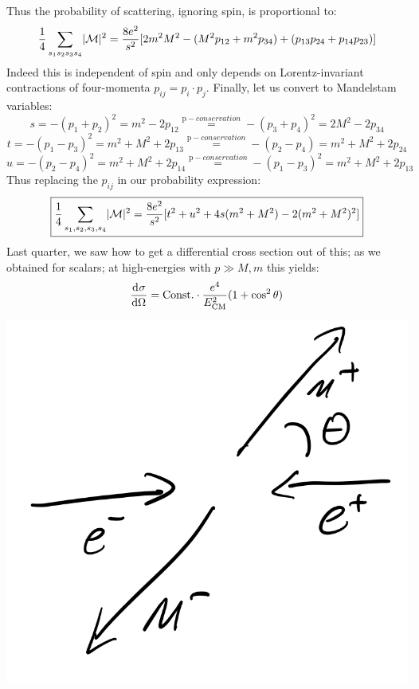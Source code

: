 Thus the probability of scattering, ignoring spin, is proportional to:
\begin{equation}
    \frac{1}{4}\sum_{s_1s_2s_3s_4}\lvert \mathcal{M} \rvert^2 = \frac{8e^2}{s^2}[2m^2M^2 - (M^2p_{12} + m^2p_{34}) + (p_{13}p_{24} + p_{14}p_{23})]
\end{equation}
Indeed this is independent of spin and only depends on Lorentz-invariant contractions of four-momenta $p_{ij} = p_i \cdot p_j$. Finally, let us convert to Mandelstam variables:
\begin{equation}
    s = -(p_1 + p_2)^2 = m^2 - 2p_{12} \stackrel{\text{p}-conservation}{=} -(p_3 + p_4)^2 = 2M^2 - 2p_{34}
\end{equation}
\begin{equation}
    t = -(p_1 - p_3)^2 = m^2 + M^2 + 2p_{13} \stackrel{\text{p}-conservation}{=} -(p_2 - p_4) = m^2 + M^2 + 2p_{24}
\end{equation}
\begin{equation}
    u = -(p_2 - p_4)^2 = m^2 + M^2 + 2p_{14} \stackrel{\text{p}-conservation}{=} -(p_1 - p_3)^2 = m^2 + M^2 + 2p_{13}
\end{equation}
Thus replacing the $p_{ij}$ in our probability expression:
\begin{equation}
    \boxed{\frac{1}{4}\sum_{s_1,s_2,s_3,s_4}\lvert \mathcal{M} \rvert^2 = \frac{8e^2}{s^2}[t^2+ u^2 + 4s(m^2 + M^2) - 2(m^2 + M^2)^2]}
\end{equation}
Last quarter, we saw how to get a differential cross section out of this; as we obtained for scalars; at high-energies with $p \gg M,m$ this yields:
\begin{equation}
    \dod{\sigma}{\Omega} = \text{Const.}\cdot\frac{e^4}{E_{\text{CM}}^2}(1 + \cos^2\theta)
\end{equation}

\begin{center}
    \includegraphics[scale=0.35]{Lectures/Images/lec13-angledependence.png}
\end{center}

